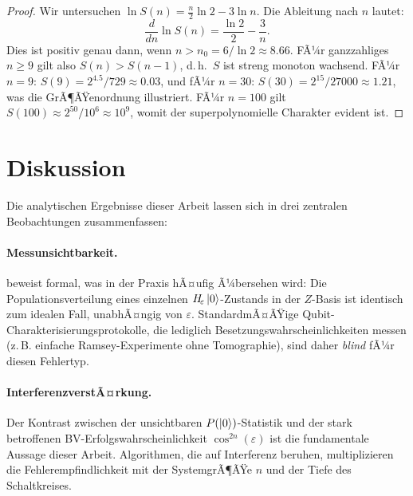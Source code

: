 ﻿\documentclass[11pt,a4paper]{article}
\theoremstyle{definition}
\newcommand{\eps}{\varepsilon}
\newcommand{\Heps}{H_{\!\varepsilon}}
\begin{document}
\begin{proof}
  Wir untersuchen $\ln S(n) = \tfrac{n}{2}\ln 2 - 3 \ln n$.  Die Ableitung
  nach $n$ lautet:
  \begin{equation}
    \frac{d}{dn} \ln S(n) = \frac{\ln 2}{2} - \frac{3}{n}.
  \end{equation}
  Dies ist positiv genau dann, wenn $n > n_0 = 6/\ln 2 \approx 8.66$.
  FÃ¼r ganzzahliges $n \geq 9$ gilt also $S(n) > S(n-1)$, d.\,h.\ $S$ ist
  streng monoton wachsend.  FÃ¼r $n = 9$: $S(9) = 2^{4.5}/729 \approx 0.03$,
  und fÃ¼r $n = 30$: $S(30) = 2^{15}/27000 \approx 1.21$, was die GrÃ¶ÃŸenordnung
  illustriert.  FÃ¼r $n = 100$ gilt $S(100) \approx 2^{50}/10^6 \approx 10^9$,
  womit der superpolynomielle Charakter evident ist.
\end{proof}

\section{Diskussion}
\label{sec:discussion}

Die analytischen Ergebnisse dieser Arbeit lassen sich in drei zentralen
Beobachtungen zusammenfassen:

\paragraph{Messunsichtbarkeit.}
 beweist formal, was in der Praxis hÃ¤ufig Ã¼bersehen wird:
Die Populationsverteilung eines einzelnen $\Heps\ket{0}$-Zustands in der
$Z$-Basis ist identisch zum idealen Fall, unabhÃ¤ngig von $\eps$.
StandardmÃ¤ÃŸige Qubit-Charakterisierungsprotokolle, die lediglich
Besetzungswahrscheinlichkeiten messen (z.\,B. einfache Ramsey-Experimente
ohne Tomographie), sind daher \emph{blind} fÃ¼r diesen Fehlertyp.

\paragraph{InterferenzverstÃ¤rkung.}
Der Kontrast zwischen der unsichtbaren $P(\ket{0})$-Statistik und der
stark betroffenen BV-Erfolgswahrscheinlichkeit $\cos^{2n}(\eps)$ ist
die fundamentale Aussage dieser Arbeit.  Algorithmen, die auf
Interferenz beruhen, multiplizieren die Fehlerempfindlichkeit mit der
SystemgrÃ¶ÃŸe $n$ und der Tiefe des Schaltkreises.
\end{document}
